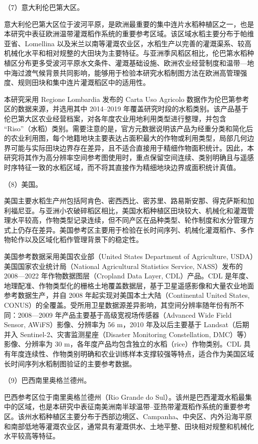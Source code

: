 \noindent （7）意大利伦巴第大区。

意大利伦巴第大区位于波河平原，是欧洲最重要的集中连片水稻种植区之一，也是本研究中表征欧洲温带灌溉稻作系统的重要参考区域。该区域水稻主要分布于帕维亚省、Lomellina 以及米兰以南等灌溉农业区，水稻生产以完善的灌溉渠系、较高机械化水平和相对规整的大田块为主要特征。与亚洲季风稻区相比，伦巴第水稻种植区分布更多受波河平原水文条件、灌溉基础设施、欧洲农业经营制度和温带—地中海过渡气候背景共同影响，能够用于检验本研究水稻制图方法在欧洲高管理强度、规则田块和集中连片灌溉稻区中的适用性。

本研究采用 Regione Lombardia 发布的 Carta Uso Agricolo 数据作为伦巴第参考区的数据来源，并选用其中 2014--2019 年覆盖研究时段的水稻类别。该产品基于伦巴第大区农业经营档案，对各年度农业用地利用类型进行整理，并包含 ``Riso''（水稻）类别。需要注意的是，官方元数据说明该产品为经重分类和简化后的农业利用图，每个地籍地块主要表达占面积最大的作物或利用类型，局部几何边界可能与实际田块边界存在差异，且不适合直接用于精细作物面积统计。因此，本研究将其作为高分辨率空间参考图使用时，重点保留空间连续、类别明确且与遥感时序特征一致的水稻区域，而不将其直接作为精细地块边界或面积统计真值。

\noindent （8）美国。

美国主要水稻生产州包括阿肯色、密西西比、密苏里、路易斯安那、得克萨斯和加利福尼亚。与亚洲小农破碎稻区相比，美国水稻种植区田块较大、机械化和灌溉管理水平较高，作物类型记录连续，但不同产区在品种类型、轮作制度和水分管理方式上仍存在差异。美国参考区主要用于检验在长时间序列、机械化灌溉稻作、多作物轮作以及区域化稻作管理背景下的稳定性。

美国参考数据采用美国农业部（United States Department of Agriculture, USDA）美国国家农业统计局（National Agricultural Statistics Service, NASS）发布的 2008—2022 年作物数据图层（Cropland Data Layer, CDL）产品。CDL 是年度、地理配准、作物类型化的栅格土地覆盖数据层，基于卫星遥感影像和大量农业地面参考数据生产，并自 2008 年起实现对美国本土大陆（Continental United States, CONUS）的全覆盖。受所用卫星数据源差异影响，其空间分辨率随年份有所不同：2008—2009 年产品主要基于高级宽视场传感器（Advanced Wide Field Sensor, AWiFS）影像、分辨率为 56 m，2010 年及以后主要基于 Landsat（后期并入 Sentinel-2、灾害监测星座（Disaster Monitoring Constellation, DMC）等）影像、分辨率为 30 m，各年度产品均包含独立的水稻（rice）作物类别。CDL 具有年度连续性、作物类别明确和农业训练样本支撑较强等特点，适合作为美国区域长时间序列水稻制图验证的主要参考数据。

\noindent （9）巴西南里奥格兰德州。

巴西参考区位于南里奥格兰德州（Rio Grande do Sul）。该州是巴西灌溉水稻最集中的区域，也是本研究中表征南美洲南半球温带--亚热带灌溉稻作系统的重要参考区。该州水稻种植区主要分布于西部边境区、Campanha、中央区、内外沿海平原和南部低地等灌溉农业区，通常具有灌溉供水、土地平整、田块相对规整和机械化水平较高等特征。

